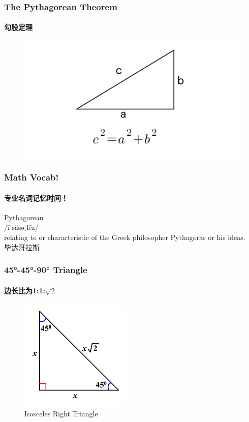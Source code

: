 \documentclass[
	11pt, %
	handout,
]{beamer}
\begin{document}
\begin{frame}
	\frametitle{The Pythagorean Theorem} %
	\framesubtitle{勾股定理}
	\begin{figure}
		\includegraphics[width=\linewidth]{Pythagorean.png}
	\end{figure}	
\end{frame}


\begin{frame}
	\frametitle{Math Vocab!} %
	\framesubtitle{专业名词记忆时间！}
	
	{\Huge Pythagorean}\\
	{\LARGE /īˈsäsəˌlēz/\\
		\bigskip\bigskip
	relating to or characteristic of the Greek philosopher Pythagoras or his ideas. \\ 
	毕达哥拉斯}
\end{frame}


\begin{frame}
	\frametitle{45°-45°-90° Triangle} %
	\framesubtitle{边长比为1:1:$\sqrt{2}$}
	\begin{figure}
		\includegraphics[width=0.5\linewidth]{45-45-90-Triangle.png}
		\caption{\alert{Isosceles Right Triangle}}
	\end{figure}	
\end{frame}
\end{document}
